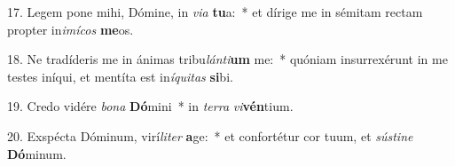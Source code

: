 17. Legem pone mihi, Dómine, in \textit{vi}\textit{a} \textbf{tu}a:~*  et dírige me in sémitam rectam propter in\textit{i}\textit{mí}\textit{cos} \textbf{me}os.\

18. Ne tradíderis me in ánimas tribu\textit{lán}\textit{ti}\textbf{um} me:~*  quóniam insurrexérunt in me testes iníqui, et mentíta est in\textit{í}\textit{qui}\textit{tas} \textbf{si}bi.\

19. Credo vidére \textit{bo}\textit{na} \textbf{Dó}mini~*  in \textit{ter}\textit{ra} \textit{vi}\textbf{vén}tium.\

20. Exspécta Dóminum, virí\textit{li}\textit{ter} \textbf{a}ge:~*  et confortétur cor tuum, et \textit{sús}\textit{ti}\textit{ne} \textbf{Dó}minum.\

